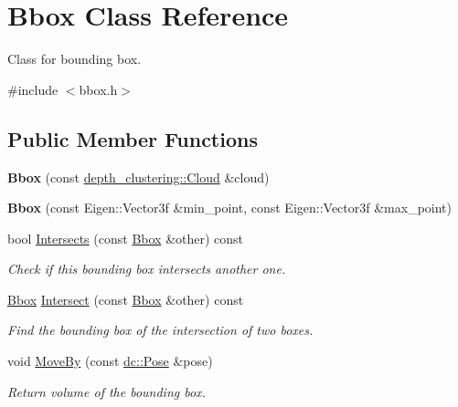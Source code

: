 \hypertarget{classBbox}{}\section{Bbox Class Reference}
\label{classBbox}


Class for bounding box.  




{\ttfamily \#include $<$bbox.\+h$>$}

\subsection*{Public Member Functions}
\begin{DoxyCompactItemize}
\item 
\mbox{\label{classBbox_a5d3657403fc62105d71327d50b753ea0}} 
{\bfseries Bbox} (const \hyperlink{classdepth__clustering_1_1Cloud}{depth\+\_\+clustering\+::\+Cloud} \&cloud)
\item 
\mbox{\label{classBbox_a4aabeabfb52b97da8ce23393d682ca97}} 
{\bfseries Bbox} (const Eigen\+::\+Vector3f \&min\+\_\+point, const Eigen\+::\+Vector3f \&max\+\_\+point)
\item 
bool \hyperlink{classBbox_a6ac93cd8475f5ef8eb4007d8c206b39d}{Intersects} (const \hyperlink{classBbox}{Bbox} \&other) const
\begin{DoxyCompactList}\small\item\em Check if this bounding box intersects another one. \end{DoxyCompactList}\item 
\hyperlink{classBbox}{Bbox} \hyperlink{classBbox_a0b8e77b794311da86b4c09ed2919af0f}{Intersect} (const \hyperlink{classBbox}{Bbox} \&other) const
\begin{DoxyCompactList}\small\item\em Find the bounding box of the intersection of two boxes. \end{DoxyCompactList}\item 
void \hyperlink{classBbox_ac590fb2bfb031f1ac4238455caf357d7}{Move\+By} (const \hyperlink{classdepth__clustering_1_1Pose}{dc\+::\+Pose} \&pose)
\begin{DoxyCompactList}\small\item\em Return volume of the bounding box. \end{DoxyCompactList}\item 
\mbox{\label{classBbox_afdb30a48b141d8905d05ef5d27983a71}} 

\end{DoxyCompactItemize}
